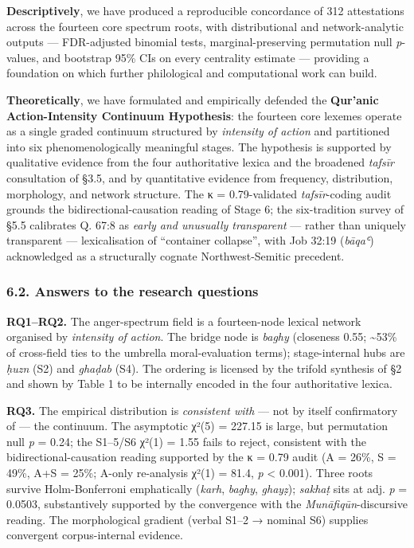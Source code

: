 \textbf{Descriptively}, we have produced a reproducible concordance of
312 attestations across the fourteen core spectrum roots, with
distributional and network-analytic outputs --- FDR-adjusted binomial
tests, marginal-preserving permutation null \emph{p}-values, and
bootstrap 95\% CIs on every centrality estimate --- providing a
foundation on which further philological and computational work can
build.

\textbf{Theoretically}, we have formulated and empirically defended the
\textbf{Qur'anic Action-Intensity Continuum Hypothesis}: the fourteen
core lexemes operate as a single graded continuum structured by
\emph{intensity of action} and partitioned into six phenomenologically
meaningful stages. The hypothesis is supported by qualitative evidence
from the four authoritative lexica and the broadened \emph{tafsīr}
consultation of §3.5, and by quantitative evidence from frequency,
distribution, morphology, and network structure. The κ = 0.79-validated
\emph{tafsīr}-coding audit grounds the bidirectional-causation reading
of Stage 6; the six-tradition survey of §5.5 calibrates Q. 67:8 as
\emph{early and unusually transparent} --- rather than uniquely
transparent --- lexicalisation of ``container collapse'', with Job 32:19
(\emph{bāqaʿ}) acknowledged as a structurally cognate Northwest-Semitic
precedent.

\subsubsection{6.2. Answers to the research
questions}\label{answers-to-the-research-questions}

\textbf{RQ1--RQ2.} The anger-spectrum field is a fourteen-node lexical
network organised by \emph{intensity of action}. The bridge node is
\emph{baghy} (closeness 0.55; \textasciitilde53\% of cross-field ties to
the umbrella moral-evaluation terms); stage-internal hubs are
\emph{ḥuzn} (S2) and \emph{ghaḍab} (S4). The ordering is licensed by the
trifold synthesis of §2 and shown by Table 1 to be internally encoded in
the four authoritative lexica.

\textbf{RQ3.} The empirical distribution is \emph{consistent with} ---
not by itself confirmatory of --- the continuum. The asymptotic χ²(5) =
227.15 is large, but permutation null \emph{p} = 0.24; the S1--5/S6
χ²(1) = 1.55 fails to reject, consistent with the
bidirectional-causation reading supported by the κ = 0.79 audit (A =
26\%, S = 49\%, A+S = 25\%; A-only re-analysis χ²(1) = 81.4, \emph{p}
\textless{} 0.001). Three roots survive Holm-Bonferroni emphatically
(\emph{karh}, \emph{baghy}, \emph{ghayẓ}); \emph{sakhaṭ} sits at adj.
\emph{p} = 0.0503, substantively supported by the convergence with the
\emph{Munāfiqūn}-discursive reading. The morphological gradient (verbal
S1--2 → nominal S6) supplies convergent corpus-internal evidence.

